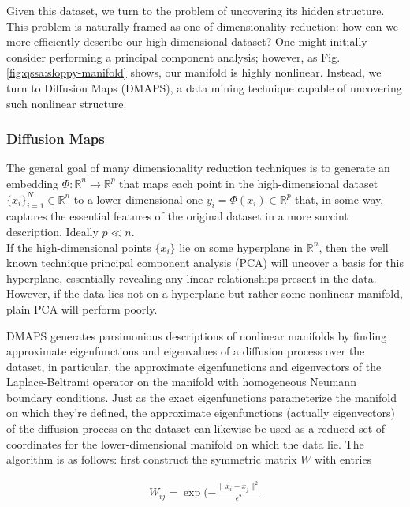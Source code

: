 \documentclass{article}
\begin{document}
Given this dataset, we turn to the problem of uncovering its hidden structure. This
problem is naturally framed as one of dimensionality reduction: how
can we more efficiently describe our high-dimensional dataset? One
might initially consider performing a principal component analysis;
however, as Fig. \ref{fig:qssa:sloppy-manifold} shows, our manifold is
highly nonlinear. Instead, we turn to Diffusion Maps (DMAPS), a data mining
technique capable of uncovering such nonlinear structure. \\

\subsubsection{Diffusion Maps}

The general goal of many dimensionality reduction techniques is to generate
an embedding $\Phi : \mathbb{R}^n \rightarrow \mathbb{R}^p$ that maps
each point in the high-dimensional dataset $\{ x_i \}_{i=1}^N \in
\mathbb{R}^n$ to a lower dimensional one $y_i = \Phi(x_i) \in
\mathbb{R}^p$ that, in some way, captures the essential features of
the original dataset in a more succint description. Ideally $p \ll
n$. \\

If the high-dimensional points $\{ x_i \}$ lie on some hyperplane in
$\mathbb{R}^n$, then the well known technique principal component
analysis (PCA) will uncover a basis for this hyperplane, essentially
revealing any linear relationships present in the data. However, if
the data lies not on a hyperplane but rather some nonlinear manifold,
plain PCA will perform poorly. 

DMAPS generates parsimonious descriptions of nonlinear manifolds by
finding approximate eigenfunctions and eigenvalues of a diffusion
process over the dataset, in particular, the approximate
eigenfunctions and eigenvectors of the Laplace-Beltrami operator on
the manifold with homogeneous Neumann boundary conditions. Just as the
exact eigenfunctions parameterize the manifold on which they're
defined, the approximate eigenfunctions (actually eigenvectors) of the
diffusion process on the dataset can likewise be used as a reduced set
of coordinates for the lower-dimensional manifold on which the data
lie. The algorithm is as follows: first construct the symmetric matrix
$W$ with entries

\begin{align*}
  W_{ij} = \exp(-\frac{\| x_i - x_j \|^2}{\epsilon^2}
\end{align*}
\end{document}

